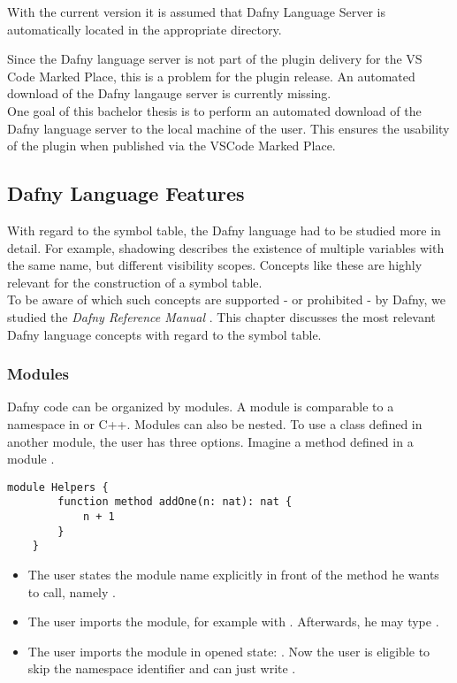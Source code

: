 With the current version it is assumed that Dafny Language Server is automatically located in the appropriate directory.

Since the Dafny language server is not part of the plugin delivery for the VS Code Marked Place,
this is a problem for the plugin release.
An automated download of the Dafny langauge server is currently missing. \\

One goal of this bachelor thesis is to perform an automated download of the Dafny language server to the local machine of the user.
This ensures the usability of the plugin when published via the VSCode Marked Place.


\subsection{Dafny Language Features}
With regard to the symbol table, the Dafny language had to be studied more in detail.
For example, shadowing describes the existence of multiple variables with the same name, but different visibility scopes.
Concepts like these are highly relevant for the construction of a symbol table. \\

To be aware of which such concepts are supported - or prohibited - by Dafny, we studied the \textit{Dafny Reference Manual} \cite{dafnyReferenceManual}.
This chapter discusses the most relevant Dafny language concepts with regard to the symbol table.

\subsubsection{Modules}
Dafny code can be organized by modules.
A module is comparable to a namespace in \CsharpWithSpace or C++.
Modules can also be nested.
To use a class defined in another module, the user has three options.
Imagine a method  defined in a module .

\begin{lstlisting}[language=dafny, caption={Module Example}, captionpos=b, label={lst:addOneMethod}]
    module Helpers {
        function method addOne(n: nat): nat {
            n + 1
        }
    }
\end{lstlisting}

\begin{itemize}
    \item The user states the module name explicitly in front of the method he wants to call, \linebreak namely .
    \item The user imports the module, for example with .
    Afterwards, he may type .
    \item The user imports the module in opened state: .
    Now the user is eligible to skip the namespace identifier and can just write .
\end{itemize}

